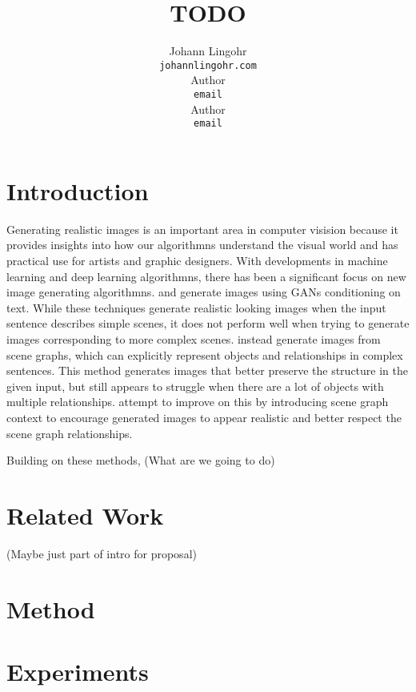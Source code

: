\documentclass{article}
\title{TODO}
\author{%
  Johann Lingohr \\
  \texttt{johannlingohr\@gmail.com} \\
  \And
  Author \\
  \texttt{email} \\
  \And
  Author \\
  \texttt{email} \\
}
\begin{document}

\maketitle

\begin{abstract}

\end{abstract}

\section{Introduction}

Generating realistic images is an important area in computer visision because it provides insights into how our algorithmns understand the visual world and has practical use for artists and graphic designers. With developments in machine learning and deep learning algorithmns, there has been a significant focus on new image generating algorithmns. \citet{t2im} and \citet{stackedgan} generate images using GANs conditioning on text. While these techniques generate realistic looking images when the input sentence describes simple scenes, it does not perform well when trying to generate images corresponding to more complex scenes. \citet{sg2im} instead generate images from scene graphs, which can explicitly represent objects and relationships in complex sentences. This method generates images that better preserve the structure in the given input, but still appears to struggle when there are a lot of objects with multiple relationships. \citet{sg2imgcontext} attempt to improve on this by introducing scene graph context to encourage generated images to appear realistic and better respect the scene graph relationships.

Building on these methods, (What are we going to do)

\section{Related Work}

(Maybe just part of intro for proposal)

\section{Method}

\section{Experiments}
\end{document}
